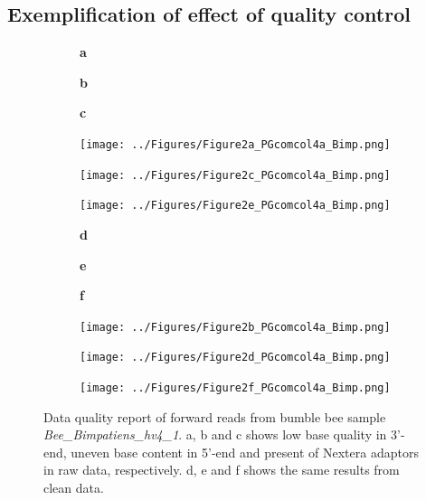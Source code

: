 \documentclass[11pt]{article}
\begin{document}
  \subsection{Exemplification of effect of quality control}
  \begin{figure}[H]
    \begin{subfigure}
      \centering
      \textbf{a}
    \end{subfigure}
    \hspace{0.32\linewidth}
    \begin{subfigure}
      \centering
      \textbf{b}
    \end{subfigure}
    \hspace{0.32\linewidth}
    \begin{subfigure}
      \centering
      \textbf{c}
    \end{subfigure}
    \newline
    \hfill
    \begin{subfigure}
      \centering
      \texttt{[image: ../Figures/Figure2a\_PGcomcol4a\_Bimp.png]}
    \end{subfigure}
    \hfill
    \begin{subfigure}
      \centering
      \texttt{[image: ../Figures/Figure2c\_PGcomcol4a\_Bimp.png]}
    \end{subfigure}
    \hfill
    \begin{subfigure}
      \centering
      \texttt{[image: ../Figures/Figure2e\_PGcomcol4a\_Bimp.png]}
    \end{subfigure}
    \newline
    \begin{subfigure}
      \centering
      \textbf{d}
    \end{subfigure}
    \hspace{0.32\linewidth}
    \begin{subfigure}
      \centering
      \textbf{e}
    \end{subfigure}
    \hspace{0.32\linewidth}
    \begin{subfigure}
      \centering
      \textbf{f}
    \end{subfigure}
    \newline
    \hfill
    \begin{subfigure}
      \centering
      \texttt{[image: ../Figures/Figure2b\_PGcomcol4a\_Bimp.png]}
    \end{subfigure}
    \hfill
    \begin{subfigure}
      \centering
      \texttt{[image: ../Figures/Figure2d\_PGcomcol4a\_Bimp.png]}
    \end{subfigure}
    \hfill
    \begin{subfigure}
      \centering
      \texttt{[image: ../Figures/Figure2f\_PGcomcol4a\_Bimp.png]}
    \end{subfigure}
    \caption{Data quality report of forward reads from bumble bee sample \textit{Bee\_Bimpatiens\_hv4\_1}. 
    a, b and c shows low base quality in 3'-end, uneven base content in 5'-end and present of Nextera adaptors in raw data, respectively. 
    d, e and f shows the same results from clean data.}
    \label{QC}
    \end{figure}
  
\end{document}
